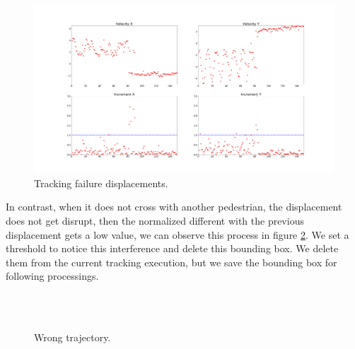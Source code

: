 \begin{figure}[H]
\centering         
\includegraphics[width=0.9\linewidth]{velocidadas/bad_threshold.png}
\caption{Tracking failure displacements.} \label{traccs23}
\end{figure}


In contrast, when it does not cross with another pedestrian, the displacement does not get disrupt, then the normalized different with the previous displacement gets a low value, we can observe this process in figure \ref{motion2nocoorrect}. We set a threshold to notice this interference and delete this bounding box. We delete them from the current tracking execution, but we save the bounding box for following processings.

\begin{figure}[H]
		
\centering

\\
\\
\caption{Wrong trajectory.}
\label{motion2nocoorrect}
\end{figure}













